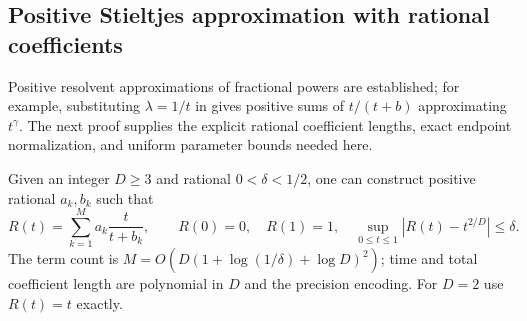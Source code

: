 \subsection{Positive Stieltjes approximation with rational coefficients}

Positive resolvent approximations of fractional powers are established;
for example, substituting $\lambda=1/t$ in
\citet[Section 3.3, equation (37) and Lemma 3.4]{bonito2015} gives
positive sums of $t/(t+b)$ approximating $t^\gamma$. The next proof
supplies the explicit rational coefficient lengths, exact endpoint
normalization, and uniform parameter bounds needed here.

\begin{lemma}\label{lem:stieltjes-power}
Given an integer $D\ge3$ and rational $0<\delta<1/2$, one can
construct positive rational $a_k,b_k$ such that
\[
 R(t)=\sum_{k=1}^M a_k\frac{t}{t+b_k},\qquad
 R(0)=0,\quad R(1)=1,\quad
 \sup_{0\le t\le1}|R(t)-t^{2/D}|\le\delta.
\]
The term count is
$M=O(D(1+\log(1/\delta)+\log D)^2)$; time and total coefficient
length are polynomial in $D$ and the precision encoding. For $D=2$
use $R(t)=t$ exactly.
\end{lemma}

